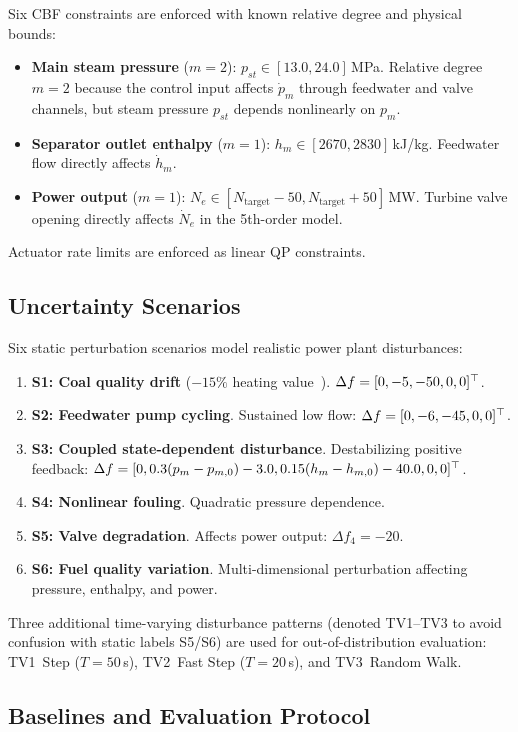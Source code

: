 Six CBF constraints are enforced with known relative degree and physical bounds:
\begin{itemize}
    \item \textbf{Main steam pressure} ($m=2$): $p_{st} \in [13.0, 24.0]$\,MPa. Relative degree $m=2$ because the control input affects $\dot{p}_m$ through feedwater and valve channels, but steam pressure $p_{st}$ depends nonlinearly on $p_m$.
    \item \textbf{Separator outlet enthalpy} ($m=1$): $h_m \in [2670, 2830]$\,kJ/kg. Feedwater flow directly affects $\dot{h}_m$.
    \item \textbf{Power output} ($m=1$): $N_e \in [N_{\mathrm{target}}-50, N_{\mathrm{target}}+50]$\,MW. Turbine valve opening directly affects $\dot{N}_e$ in the 5th-order model.
\end{itemize}
Actuator rate limits are enforced as linear QP constraints.

\subsection{Uncertainty Scenarios}

Six static perturbation scenarios model realistic power plant disturbances:
\begin{enumerate}
    \item \textbf{S1: Coal quality drift} ($-15\%$ heating value~\cite{liu2016coal}). $\Delta f = [0, -5, -50, 0, 0]^\top$.
    \item \textbf{S2: Feedwater pump cycling}. Sustained low flow: $\Delta f = [0, -6, -45, 0, 0]^\top$.
    \item \textbf{S3: Coupled state-dependent disturbance}. Destabilizing positive feedback: $\Delta f = [0, 0.3(p_m-p_{m,0})-3.0, 0.15(h_m-h_{m,0})-40.0, 0, 0]^\top$.
    \item \textbf{S4: Nonlinear fouling}. Quadratic pressure dependence.
    \item \textbf{S5: Valve degradation}. Affects power output: $\Delta f_4 = -20$.
    \item \textbf{S6: Fuel quality variation}. Multi-dimensional perturbation affecting pressure, enthalpy, and power.
\end{enumerate}
Three additional time-varying disturbance patterns (denoted TV1--TV3 to avoid confusion with static labels S5/S6) are used for out-of-distribution evaluation: TV1~Step ($T=50$\,s), TV2~Fast Step ($T=20$\,s), and TV3~Random Walk.

\subsection{Baselines and Evaluation Protocol}

